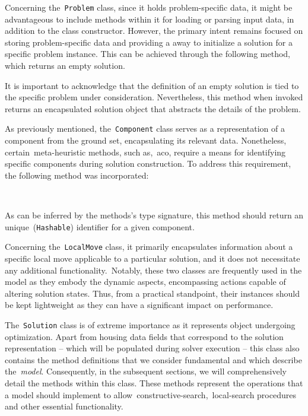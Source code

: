 Concerning the~\texttt{Problem} class, since it holds problem-specific data, it
might be advantageous to include methods within it for loading or parsing input
data, in addition to the class constructor. However, the primary intent remains
focused on storing problem-specific data and providing a away to initialize a
solution for a specific problem instance. This can be achieved through the
following method, which returns an empty solution.

\begin{center}
\end{center}

It is important to acknowledge that the definition of an empty solution is tied
to the specific problem under consideration. Nevertheless, this method when
invoked returns an encapsulated solution object that abstracts the details of the problem.

As previously mentioned, the~\texttt{Component} class serves as a representation
of a component from the ground set, encapsulating its relevant data.
Nonetheless, certain~\acrshort{meta-heuristic} methods, such as,~\acrshort{aco},
require a means for identifying specific components during solution
construction. To address this requirement, the following method was
incorporated:

\begin{center}
  \\
\end{center}

As can be inferred by the methods's type signature, this method should return
an unique~(\texttt{Hashable}) identifier for a given component.

Concerning the~\texttt{LocalMove} class, it primarily encapsulates information
about a specific local move applicable to a particular solution, and it does not
necessitate any additional functionality.~Notably, these two classes are
frequently used in the model as they embody the dynamic aspects, encompassing
actions capable of altering solution states. Thus, from a practical standpoint,
their instances should be kept lightweight as they can have a significant impact
on performance.

The~\texttt{Solution} class is of extreme importance as it represents object
undergoing optimization. Apart from housing data fields that correspond to the
solution representation -- which will be populated during solver execution --
this class also contains the method definitions that we consider fundamental and
which describe the~\emph{model}. Consequently, in the subsequent sections, we
will comprehensively detail the methods within this class. These methods
represent the operations that a model should implement to
allow~\acrshort{constructive-search},~\acrshort{local-search} procedures and
other essential functionality.

